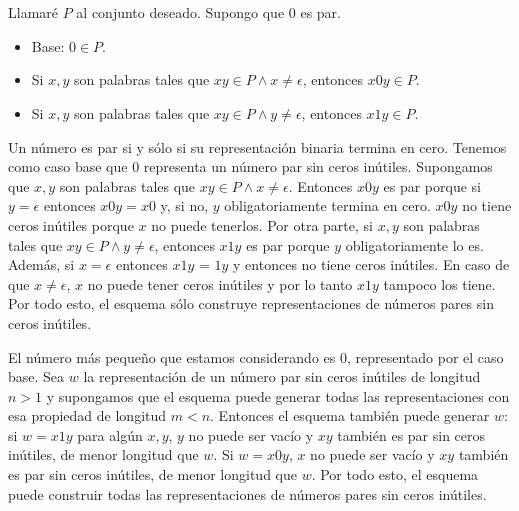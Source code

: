 \documentclass{article}
\begin{document}
\section{}

\subsection{}

Llamaré $P$ al conjunto deseado. Supongo que $0$ es par.

\begin{itemize}
\item Base: $0 \in P$.

\item Si $x,y$ son palabras tales que
$xy \in P \wedge x \neq \epsilon$, entonces $x0y \in P$.

\item Si $x,y$ son palabras tales que
$xy \in P \wedge y \neq \epsilon$, entonces $x1y \in P$.
\end{itemize}

Un número es par si y sólo si su representación binaria termina en cero.
Tenemos como caso base que $0$ representa un número par sin ceros inútiles.
Supongamos que $x,y$ son palabras tales que $xy \in P \wedge x \neq \epsilon$.
Entonces $x0y$ es par porque si $y = \epsilon$ entonces $x0y = x0$ y, si no,
$y$ obligatoriamente termina en cero. $x0y$ no tiene ceros inútiles porque $x$
no puede tenerlos. Por otra parte, si $x, y$ son palabras tales que
$xy \in P \wedge y \neq \epsilon$, entonces $x1y$ es par porque $y$
obligatoriamente lo es. Además, si $x = \epsilon$ entonces $x1y$ = $1y$ y
entonces no tiene ceros inútiles. En caso de que $x \neq \epsilon$, $x$ no puede
tener ceros inútiles y por lo tanto $x1y$ tampoco los tiene. Por todo esto, el
esquema sólo construye representaciones de números pares sin ceros inútiles.

El número más pequeño que estamos considerando es $0$, representado por el
caso base. Sea $w$ la representación de un número par sin ceros inútiles de
longitud $n > 1$ y supongamos que el esquema puede generar todas las
representaciones con esa propiedad de longitud $m < n$. Entonces el esquema
también puede generar $w$: si $w = x1y$ para algún $x, y$, $y$ no puede ser
vacío y $xy$ también es par sin ceros inútiles, de menor longitud que $w$. Si
$w = x0y$, $x$ no puede ser vacío y $xy$ también es par sin ceros inútiles, de
menor longitud que $w$.
Por todo esto, el esquema puede construir todas las representaciones de números
pares sin ceros inútiles.
\end{document}
